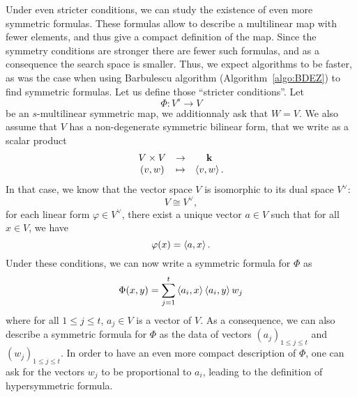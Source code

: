 Under even stricter conditions, we can study the existence of even more
symmetric formulas. These formulas allow to describe a multilinear map with
fewer elements, and thus give a compact definition of the map. Since the
symmetry conditions are stronger there are fewer such formulas, and as a
consequence the search space is smaller. Thus, we expect algorithms to be
faster, as was the case when using Barbulescu \etal algorithm
(Algorithm~\ref{algo:BDEZ}) to find symmetric formulas. Let us define those
``stricter conditions''. Let
\[
  \Phi:V^s\to V
\]
be an $s$-multilinear symmetric map, \ie we additionnaly ask that $W=V$. We also
assume that $V$ has a non-degenerate symmetric bilinear form, that we write as a
scalar product
\[
 \begin{array}{ccc}
 V\times V &\to&\mathbf{k}\\
 (v,w)&\mapsto&\left\langle v,w\right\rangle.
 \end{array}
\]
In that case, we know that the vector space $V$ is isomorphic to its dual space
$V^\vee$:
\[
  V\cong V^\vee,
\]
\ie for each linear form $\varphi\in V^\vee$, there exist a unique vector $a\in
V$ such that for all $x\in V$, we have
\[
  \varphi(x) = \left\langle a,x\right\rangle.
\]
Under these conditions, we can now write a symmetric formula for $\Phi$ as
\[
  \Phi(x, y) = \sum_{j=1}^t\left\langle a_i,x\right\rangle\left\langle a_i,y\right\rangle w_j
\]
where for all $1\leq j\leq t$, $a_j\in V$ is a vector of $V$. As a consequence,
we can also describe a symmetric formula for $\Phi$ as the data of vectors
$(a_j)_{1\leq j\leq t}$ and $(w_j)_{1\leq j\leq t}$. In order to have an even
more compact description of $\Phi$, one can ask for the vectors $w_j$ to be
proportional to $a_i$, leading to the definition of hypersymmetric
formula.
%
%
%

